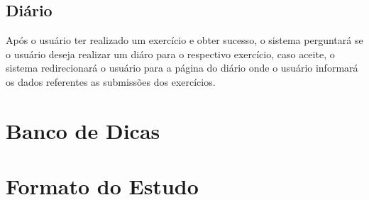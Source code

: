 \subsection{Diário}

Após o usuário ter realizado um exercício e obter sucesso, o sistema perguntará se o usuário deseja realizar um diáro para o respectivo exercício, caso aceite, o sistema redirecionará o usuário para a página do diário onde o usuário informará os dados referentes as submissões dos exercícios.

\section{Banco de Dicas}

\section{Formato do Estudo}
